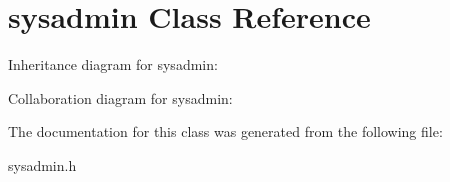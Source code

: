 \hypertarget{classsysadmin}{}\section{sysadmin Class Reference}
\label{classsysadmin}


Inheritance diagram for sysadmin\+:


Collaboration diagram for sysadmin\+:


The documentation for this class was generated from the following file\+:\begin{DoxyCompactItemize}
\item 
sysadmin.\+h\end{DoxyCompactItemize}
